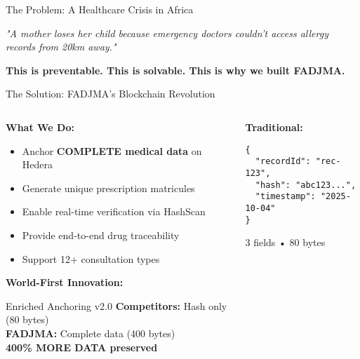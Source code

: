 \documentclass[aspectratio=169,xcolor=dvipsnames,14pt]{beamer}
\newcommand{\checkitem}{\item[\color{SuccessGreen}\faCheckCircle]}
\begin{document}
\begin{frame}{The Problem: A Healthcare Crisis in Africa}
  \vspace{0.3cm}

  \begin{center}
    \textit{\textcolor{DangerRed}{"A mother loses her child because emergency doctors couldn't access allergy records from 20km away."}}

    \textbf{This is preventable. This is solvable. This is why we built FADJMA.}
  \end{center}

\end{frame}

\begin{frame}[fragile,shrink=5]{The Solution: FADJMA's Blockchain Revolution}
\small
  \begin{columns}[T]
    \begin{column}{0.5\textwidth}
      \textbf{What We Do:}
      \begin{itemize}
        \checkitem Anchor \textbf{COMPLETE medical data} on Hedera
        \checkitem Generate unique prescription matricules
        \checkitem Enable real-time verification via HashScan
        \checkitem Provide end-to-end drug traceability
        \checkitem Support 12+ consultation types
      \end{itemize}

      \vspace{0.2cm}

      \textbf{\textcolor{HederaPurple}{World-First Innovation:}}
      \begin{block}{Enriched Anchoring v2.0}
        \small
        \textbf{Competitors:} Hash only (80 bytes) \\
        \textbf{FADJMA:} Complete data (400 bytes) \\
        \textcolor{SuccessGreen}{\textbf{400\% MORE DATA preserved}}
      \end{block}
    \end{column}

    \begin{column}{0.5\textwidth}
      \scriptsize
      \textbf{Traditional:}
      \begin{verbatim}
{
  "recordId": "rec-123",
  "hash": "abc123...",
  "timestamp": "2025-10-04"
}
      \end{verbatim}
      \textcolor{DangerRed}{3 fields • 80 bytes}

      \vspace{0.15cm}


\end{column}
\end{columns}
\end{frame}
\end{document}
